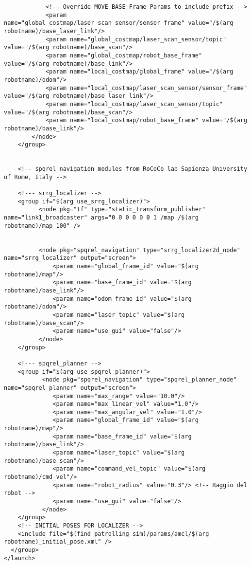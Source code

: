 \begin{lstlisting}
            <!-- Override MOVE_BASE Frame Params to include prefix -->
            <param name="global_costmap/laser_scan_sensor/sensor_frame" value="/$(arg robotname)/base_laser_link"/>
            <param name="global_costmap/laser_scan_sensor/topic" value="/$(arg robotname)/base_scan"/>
            <param name="global_costmap/robot_base_frame" value="/$(arg robotname)/base_link"/>   
            <param name="local_costmap/global_frame" value="/$(arg robotname)/odom"/>
            <param name="local_costmap/laser_scan_sensor/sensor_frame" value="/$(arg robotname)/base_laser_link"/>
            <param name="local_costmap/laser_scan_sensor/topic" value="/$(arg robotname)/base_scan"/>
            <param name="local_costmap/robot_base_frame" value="/$(arg robotname)/base_link"/> 
        </node>
    </group>


    <!-- spqrel_navigation modules from RoCoCo lab Sapienza University of Rome, Italy -->       

    <!--- srrg_localizer -->
    <group if="$(arg use_srrg_localizer)">
          <node pkg="tf" type="static_transform_publisher" name="link1_broadcaster" args="0 0 0 0 0 0 1 /map /$(arg robotname)/map 100" />
      
            
          <node pkg="spqrel_navigation" type="srrg_localizer2d_node" name="srrg_localizer" output="screen">
              <param name="global_frame_id" value="$(arg robotname)/map"/>
              <param name="base_frame_id" value="$(arg robotname)/base_link"/>
              <param name="odom_frame_id" value="$(arg robotname)/odom"/>
              <param name="laser_topic" value="$(arg robotname)/base_scan"/>
              <param name="use_gui" value="false"/>
          </node>
    </group>

    <!--- spqrel_planner -->    
    <group if="$(arg use_spqrel_planner)">            
           <node pkg="spqrel_navigation" type="spqrel_planner_node" name="spqrel_planner" output="screen">
              <param name="max_range" value="10.0"/>
              <param name="max_linear_vel" value="1.0"/>
              <param name="max_angular_vel" value="1.0"/>
              <param name="global_frame_id" value="$(arg robotname)/map"/>
              <param name="base_frame_id" value="$(arg robotname)/base_link"/>
              <param name="laser_topic" value="$(arg robotname)/base_scan"/>
              <param name="command_vel_topic" value="$(arg robotname)/cmd_vel"/>
              <param name="robot_radius" value="0.3"/> <!-- Raggio del robot -->
              <param name="use_gui" value="false"/>
           </node>
    </group>
    <!-- INITIAL POSES FOR LOCALIZER -->
    <include file="$(find patrolling_sim)/params/amcl/$(arg robotname)_initial_pose.xml" />
  </group>
</launch>
\end{lstlisting}

